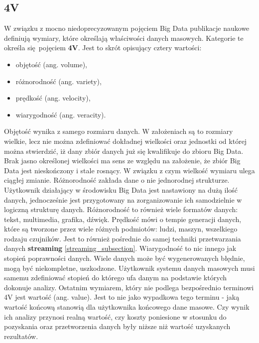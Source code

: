 \subsection{4V}
W związku z mocno niedoprecyzowanym pojęciem Big Data publikacje naukowe definiują wymiary, które określają właściwości danych masowych\cite{big_data_great_services}. Kategorie te określa się pojęciem \textbf{4V}. Jest to skrót opisujący cztery wartości:
\begin{itemize}
	\item objętość (ang. volume),
	\item różnorodność (ang. variety),
	\item prędkość (ang. velocity),
	\item wiarygodność (ang. veracity).
\end{itemize}
Objętość wynika z samego rozmiaru danych. W założeniach są to rozmiary wielkie, lecz nie można zdefiniować dokładnej wielkości oraz jednostki od której można stwierdzić, iż dany zbiór danych już się kwalifikuje do zbioru Big Data. Brak jasno określonej wielkości ma sens ze względu na założenie, że zbiór Big Data jest nieskończony i stale rosnący. W związku z czym wielkość wymiaru ulega ciągłej zmianie.\newline
Różnorodność zakłada dane o nie jednorodnej strukturze. Użytkownik działający w środowisku Big Data jest nastawiony na dużą ilość danych, jednocześnie jest przygotowany na zorganizowanie ich samodzielnie w logiczną strukturę danych. Różnorodność to również wiele formatów danych: tekst, multimedia, grafika, dźwięk.\newline
Prędkość mówi o tempie generacji danych, które są tworzone przez wiele różnych podmiotów: ludzi, maszyn, wszelkiego rodzaju czujników. Jest to również pośrednie do samej techniki przetwarzania danych \textbf{streaming} \ref{streaming_subsection}.\newline
Wiarygodność to nic innego jak stopień poprawności danych. Wiele danych może być wygenerowanych błędnie, mogą być niekompletne, uszkodzone. Użytkownik systemu danych masowych musi samemu zdefiniować stopień do którego ufa danym na podstawie których dokonuje analizy.\newline
Ostatnim wymiarem, który nie podlega bezpośrednio terminowi 4V jest wartość (ang. value). Jest to nie jako wypadkowa tego terminu - jaką wartość końcową stanowią dla użytkownika końcowego dane masowe. Czy wynik ich analizy przynosi realną wartość, czy koszty poniesione w stosunku do pozyskania oraz przetworzenia danych były niższe niż wartość uzyskanych rezultatów.
